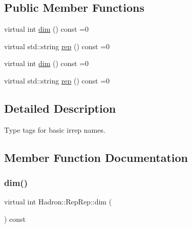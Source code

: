 \subsection*{Public Member Functions}
\begin{DoxyCompactItemize}
\item 
virtual int \mbox{\hyperlink{structHadron_1_1RepRep_a92c8802e5ed7afd7da43ccfd5b7cd92b}{dim}} () const =0
\item 
virtual std\+::string \mbox{\hyperlink{structHadron_1_1RepRep_ab3213025f6de249f7095892109575fde}{rep}} () const =0
\item 
virtual int \mbox{\hyperlink{structHadron_1_1RepRep_a92c8802e5ed7afd7da43ccfd5b7cd92b}{dim}} () const =0
\item 
virtual std\+::string \mbox{\hyperlink{structHadron_1_1RepRep_ab3213025f6de249f7095892109575fde}{rep}} () const =0
\end{DoxyCompactItemize}


\subsection{Detailed Description}
Type tags for basic irrep names. 

\subsection{Member Function Documentation}
\mbox{\label{structHadron_1_1RepRep_a92c8802e5ed7afd7da43ccfd5b7cd92b}} 
\subsubsection{\texorpdfstring{dim()}{dim()}\hspace{0.1cm}{\footnotesize\ttfamily [1/2]}}
{\footnotesize\ttfamily virtual int Hadron\+::\+Rep\+Rep\+::dim (\begin{DoxyParamCaption}{ }\end{DoxyParamCaption}) const\hspace{0.3cm}{\ttfamily [pure virtual]}}



